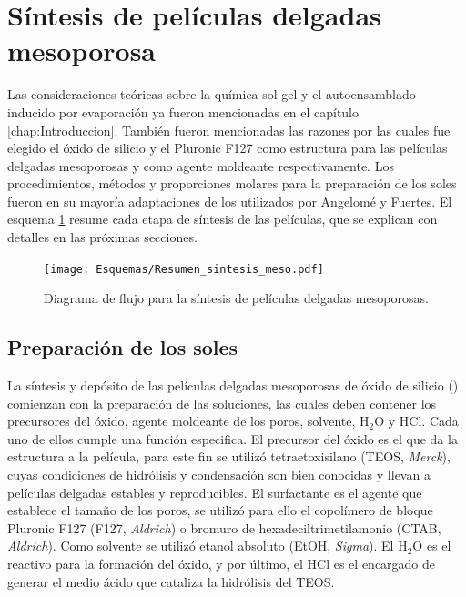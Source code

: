 \section{Síntesis de películas delgadas mesoporosa}\label{sec:sintesis_mesoporosos}	
	Las consideraciones teóricas sobre la química sol-gel y el autoensamblado inducido por evaporación ya fueron mencionadas en el capítulo \ref{chap:Introduccion}. También fueron mencionadas las razones por las cuales fue elegido el óxido de silicio y el Pluronic F127 como estructura para las películas delgadas mesoporosas y como agente moldeante respectivamente. Los procedimientos, métodos y proporciones molares para la preparación de los soles fueron en su mayoría adaptaciones de los utilizados por Angelomé\cite{Angelome2008} y Fuertes\cite{Fuertes2009}. El esquema \ref{esq:peliculas_meso} resume cada etapa de síntesis de las películas, que se explican con detalles en las próximas secciones.
		  \begin{figure}[ht]
			  \begin{center}
			  \texttt{[image: Esquemas/Resumen\_sintesis\_meso.pdf]}
			  \caption[Síntesis de películas delgadas mesoporosas]{Diagrama de flujo para la síntesis de películas delgadas mesoporosas.}
			  \label{esq:peliculas_meso}
			  \end{center}
			  \end{figure}

	\subsection{Preparación de los soles}
		La síntesis y depósito de las películas delgadas mesoporosas de óxido de silicio (\pdm) comienzan con la preparación de las soluciones, las cuales deben contener los precursores del óxido, agente moldeante de los poros, solvente, H$_2$O y HCl\cite{Brinker1990}. Cada uno de ellos cumple una función especifica. El precursor del óxido es el que da la estructura a la película, para este fin se utilizó tetraetoxisilano (TEOS, \textit{Merck}), cuyas condiciones de hidrólisis y condensación son bien conocidas y llevan a películas delgadas estables y reproducibles. El surfactante es el agente que establece el tamaño de los poros, se utilizó para ello el copolímero de bloque Pluronic F127 (F127, \textit{Aldrich}) o bromuro de hexadeciltrimetilamonio (CTAB, \textit{Aldrich}). Como solvente se utilizó etanol absoluto (EtOH, \textit{Sigma}). El H$_2$O es el reactivo para la formación del óxido, y por último, el HCl es el encargado de generar el medio ácido que cataliza la hidrólisis del TEOS. 
		
